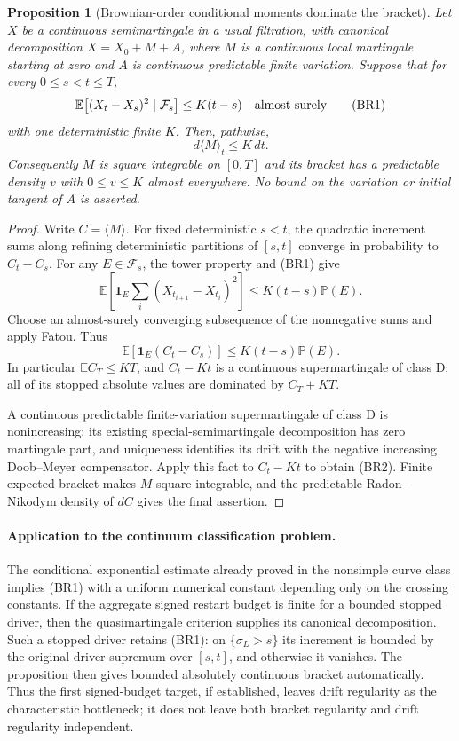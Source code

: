 \documentclass[11pt]{article}
\newtheorem{proposition}[theorem]{Proposition}
\theoremstyle{definition}\newtheorem{definition}[theorem]{Definition}
\theoremstyle{remark}\newtheorem{remark}[theorem]{Remark}
\begin{document}
\begin{proposition}[Brownian-order conditional moments dominate the bracket]
\label{prop:moment-bracket-domination}
Let $X$ be a continuous semimartingale in a usual filtration, with
canonical decomposition $X=X_0+M+A$, where $M$ is a continuous local
martingale starting at zero and $A$ is continuous predictable finite
variation. Suppose that for every $0\le s<t\le T$,
\[
 \mathbb E\bigl[(X_t-X_s)^2\mid\mathcal F_s\bigr]
       \le K(t-s)\quad\hbox{almost surely}
 \tag{BR1}
\]
with one deterministic finite $K$. Then, pathwise,
\[
 d\langle M\rangle_t\le K\,dt.
 \tag{BR2}
\]
Consequently $M$ is square integrable on $[0,T]$ and its bracket has
a predictable density $v$ with $0\le v\le K$ almost everywhere.
No bound on the variation or initial tangent of $A$ is asserted.
\end{proposition}
\begin{proof}
Write $C=\langle M\rangle$. For fixed deterministic $s<t$, the
quadratic increment sums along refining deterministic partitions of
$[s,t]$ converge in probability to $C_t-C_s$. For any
$E\in\mathcal F_s$, the tower property and (BR1) give
\[
 \mathbb E\left[\mathbf1_E\sum_i
       (X_{t_{i+1}}-X_{t_i})^2\right]
       \le K(t-s)\mathbb P(E).
\]
Choose an almost-surely converging subsequence of the nonnegative
sums and apply Fatou. Thus
\[
 \mathbb E[\mathbf1_E(C_t-C_s)]
       \le K(t-s)\mathbb P(E).
 \tag{BR3}
\]
In particular $\mathbb E C_T\le KT$, and $C_t-Kt$ is a
continuous supermartingale of class D: all of its stopped absolute
values are dominated by $C_T+KT$.

A continuous predictable finite-variation supermartingale of class D
is nonincreasing: its existing special-semimartingale decomposition has
zero martingale part, and uniqueness identifies its drift with the
negative increasing Doob--Meyer compensator. Apply this fact to
$C_t-Kt$ to obtain (BR2). Finite expected bracket makes $M$ square
integrable, and the predictable Radon--Nikodym density of $dC$ gives
the final assertion.
\end{proof}

\paragraph{Application to the continuum classification problem.}
The conditional exponential estimate already proved in the nonsimple
curve class implies (BR1) with a uniform numerical constant depending
only on the crossing constants. If the aggregate signed restart budget
is finite for a bounded stopped driver, then the quasimartingale
criterion supplies its canonical decomposition. Such a stopped driver
retains (BR1): on $\{\sigma_L>s\}$ its increment is bounded by the
original driver supremum over $[s,t]$, and otherwise it vanishes. The proposition then
gives bounded absolutely continuous bracket automatically. Thus the
first signed-budget target, if established, leaves drift regularity
as the characteristic bottleneck; it does not leave both bracket
regularity and drift regularity independent.
\end{document}
